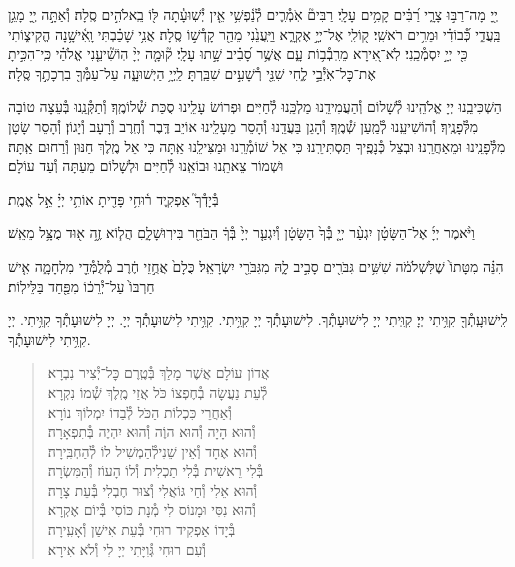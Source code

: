 \documentclass[twoside, openany, parskip=half, 11pt]{book}
\begin{document}
יְ֖יָ מָה־רַבּ֣וּ צָרָ֑י רַ֝בִּ֗ים קָמִ֥ים עָלָֽי׃ רַבִּים֘ אֹֽמְ֯רִ֢ים לְ֯נַ֫פְשִׁ֥י אֵ֤ין יְ֯שֽׁוּעָ֓תָה לּ֖וֹ בֵֽאלֹהִ֣ים סֶֽלָה׃ וְ֯אַתָּ֣ה יְ֖יָ מָגֵ֥ן בַּֽעֲדִ֑י כְּ֝֯בוֹדִ֗י וּמֵרִ֥ים רֹאשִֽׁי׃ ק֭וֹלִֽי אֶל־יְיָ֣ אֶקְרָ֑א וַיַּֽעֲנֵ֙נִי מֵהַ֖ר קָדְ֯שׁ֣וֹ סֶֽלָה׃ אֲנִ֥י שָׁכַ֗בְתִּי וָֽאִ֫ישָׁ֥נָה הֱקִיצ֑וֹתִי כִּ֖י יְיָ֣ יִסְמְ֯כֵֽנִי׃ לֹֽא־אִ֭ירָא מֵרִֽבְ֯ב֥וֹת עָ֑ם אֲשֶׁ֥ר סָ֝בִ֗יב שָׁ֣תוּ עָלָֽי׃ ק֘וּמָ֤ה יְיָ֨ הֽוֹשִׁ֘יעֵ֤נִי אֱלֹהַ֗י כִּֽי־הִכִּ֣יתָ אֶת־כׇּל־אֹֽיְ֯בַ֣י לֶ֑חִי שִׁנֵּ֖י רְ֯שָׁעִ֣ים שִׁבַּֽרְתָּ׃ לַֽיְיָ֥ הַיְשׁוּעָ֑ה עַל־עַמְּ֯ךָ֖ בִרְכָתֶ֣ךָ סֶּֽלָה׃

הַשְׁכִּיבֵֽנוּ יְיָ אֱלֹהֵֽינוּ לְ֯שָׁלוֹם וְ֯הַעֲמִידֵֽנוּ מַלְכֵּֽנוּ לְ֯חַיִּים׃ וּפְרוֹשׂ עָלֵֽינוּ סֻכַּת שְׁ֯לוֹמֶֽךָ׃ וְ֯תַקְּ֯נֵֽנוּ בְּ֯עֵצָה טוֹבָה מִלְּ֯פָנֶֽיךָ׃ וְ֯הוֹשִׁיעֵֽנוּ לְ֯מַֽעַן שְׁ֯מֶֽךָ׃ וְ֯הָגֵן בַּעֲדֵֽנוּ וְ֯הָסֵר מֵעָלֵֽינוּ אוֹיֵב דֶּֽבֶר וְ֯חֶֽרֶב וְ֯רָעָב וְ֯יָגוֹן׃ וְ֯הָסֵר שָׂטָן מִלְּ֯פָנֵֽינוּ וּמֵאַחֲרֵֽנוּ׃ וּבְצֵל כְּ֯נָפֶֽיךָ תַּסְתִּירֵֽנוּ׃ כִּי אֵל שׁוֹמְ֯רֵֽנוּ וּמַצִּילֵֽנוּ אַֽתָּה כִּי אֵל מֶֽלֶךְ חַנּוּן וְ֯רַחוּם אַֽתָּה׃ וּשְׁמוֹר צֵאתֵֽנוּ וּבוֹאֵֽנוּ לְ֯חַיִּים וּלְשָׁלוֹם מֵעַתָּה וְ֯עַד עוֹלָם׃

בְּ֯יָדְ֯ךָ֮ אַפְקִ֢יד ר֫וּחִ֥י פָּדִ֖יתָ אוֹתִ֥י יְיָ֗ אֵ֣ל אֱמֶֽת׃

וַיֹּ֨אמֶר יְיָ֜ אֶל־הַשָּׂטָ֗ן יִגְעַ֨ר יְיָ֤ בְּ֯ךָ֙ הַשָּׂטָ֔ן וְ֯יִגְעַ֤ר יְיָ֙ בְּ֯ךָ֔ הַבֹּחֵ֖ר בִּירֽוּשָׁלָ֑םִ הֲל֧וֹא זֶ֦ה א֖וּד מֻצָּ֥ל מֵאֵֽשׁ׃

הִנֵּ֗ה מִטָּתוֹ֙ שֶׁלִּשְׁלֹמֹ֔ה שִׁשִּׁ֥ים גִּבֹּרִ֖ים סָבִ֣יב לָ֑הּ מִגִּבֹּרֵ֖י יִשְׂרָאֵֽל׃ כֻּלָם֙ אֲחֻ֣זֵי חֶ֔רֶב מְ֯לֻמְּ֯דֵ֖י מִלְחָמָ֑ה אִ֤ישׁ חַרְבּוֹ֙ עַל־יְ֯רֵכ֔וֹ מִפַּ֖חַד בַּלֵּילֽוֹת׃


לִֽישׁוּעָֽתְ֯ךָ֖ קִוִּ֥יתִי יְיָ׃ קִוִּֽיתִי יְיָ לִישׁוּעָתְ֯ךָ. לִישׁוּעָתְ֯ךָ יְיָ קִוִּ֥יתִי. קִוִּ֥יתִי לִישׁוּעָתְ֯ךָ יְיָ. יְיָ לִישׁוּעָתְ֯ךָ קִוִּ֥יתִי. יְיָ קִוִּ֥יתִי לִישׁוּעָתְ֯ךָ.

\vspace{-\baselineskip}
\begin{quote}

אֲדוֹן עוֹלָם אֲשֶׁר מָלַךְ \hfill בְּ֯טֶֽרֶם כׇּל־יְ֯צִיר נִבְרָא׃\\
לְ֯עֵת נַעֲשָׂה בְ֯חֶפְצוֹ כֹּל \hfill אֲזַי מֶֽלֶךְ שְׁ֯מוֹ נִקְרָא׃\\
וְ֯אַחֲרֵי כִּכְלוֹת הַכֹּל \hfill לְ֯בַדוֹ יִמְלוֹךְ נוֹרָא׃\\
וְ֯הוּא הָיָה וְ֯הוּא הוֶֹה \hfill וְ֯הוּא יִהְיֶה בְּ֯תִפְאָרָה׃\\
וְ֯הוּא אֶחָד וְ֯אֵין שֵׁנִי\hfill לְ֯הַמְשִׁיל לוֹ לְ֯הַחְבִּֽירָה׃\\
בְּ֯לִי רֵאשִׁית בְּ֯לִי תַכְלִית \hfill וְ֯לוֹ הָעוֹז וְ֯הַמִּשְׂרָה׃\\
וְ֯הוּא אֵלִי וְ֯חַי גּוֹאֲלִי \hfill וְ֯צוּר חֶבְלִי בְּ֯עֵת צָרָה׃\\
וְ֯הוּא נִסִּי וּמָנוֹס לִי \hfill מְ֯נָת כּוֹסִי בְּ֯יוֹם אֶקְרָא׃\\
בְּ֯יָדוֹ אַפְקִיד רוּחִי \hfill בְּ֯עֵת אִישַׁן וְ֯אָעִֽירָה׃\\
וְ֯עִם רוּחִי גְּ֯וִיָּתִי \hfill יְיָ לִי וְ֯לֹא אִירָא׃

\end{quote}
\end{document}
